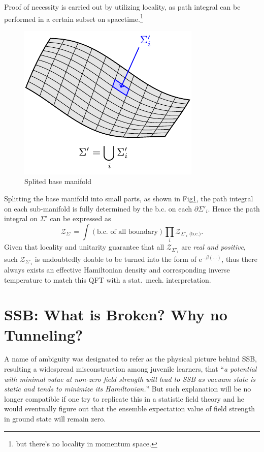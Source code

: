 Proof of necessity is carried out by utilizing locality, as path integral can be performed in a certain subset on spacetime.\footnote{but there's no locality in momentum space.}
\begin{figure}
    \centering
    \includegraphics{figures/splited_base_manifold.pdf}
    \caption{Splited base manifold}
    \label{split_manifold}
\end{figure}
Splitting the base manifold into small parts, as shown in Fig\ref{split_manifold}, the path integral on each sub-manifold is fully determined by the b.c. on each $\partial\Sigma'_{i}$. Hence the path integral on $\Sigma'$ can be expressed as
\begin{equation}
    \mathcal{Z}_{\Sigma'} = \int \left( \text{b.c. of all boundary} \right) \prod_{i} \mathcal{Z}_{\Sigma' _{i} \text{ (b.c.)}}.
\end{equation}
Given that locality and unitarity guarantee that all $\mathcal{Z}_{\Sigma'_{i}}$ are \emph{real and positive}, such $\mathcal{Z}_{\Sigma'_{i}}$ is undoubtedly doable to be turned into the form of $\mathrm{e}^{- \tilde{\beta} \left( \cdots \right) }$, thus there always exists an effective Hamiltonian density and corresponding inverse temperature to match this QFT with a stat.~mech. interpretation.


\section[When do Symmetries Break Spontaneously]{SSB: What is Broken? Why no Tunneling?}

A name of ambiguity was designated to refer as the physical picture behind SSB, resulting a widespread misconstruction among juvenile learners, that ``\emph{a potential with minimal value at non-zero field strength will lead to SSB as vacuum state is static and tends to minimize its Hamiltonian.}'' But such explanation will be no longer compatible if one try to replicate this in a statistic field theory and he would eventually figure out that the ensemble expectation value of field strength in ground state will remain zero. 

